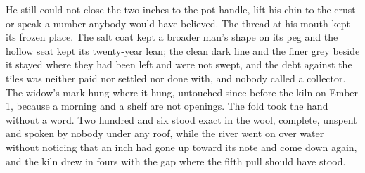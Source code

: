 He still could not close the two inches to the pot handle, lift his chin to the crust or speak a number anybody would have believed. The thread at his mouth kept its frozen place. The salt coat kept a broader man's shape on its peg and the hollow seat kept its twenty-year lean; the clean dark line and the finer grey beside it stayed where they had been left and were not swept, and the debt against the tiles was neither paid nor settled nor done with, and nobody called a collector. The widow's mark hung where it hung, untouched since before the kiln on Ember 1, because a morning and a shelf are not openings. The fold took the hand without a word. Two hundred and six stood exact in the wool, complete, unspent and spoken by nobody under any roof, while the river went on over water without noticing that an inch had gone up toward its note and come down again, and the kiln drew in fours with the gap where the fifth pull should have stood.
